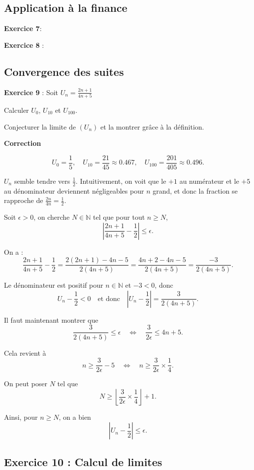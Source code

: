 \documentclass[a4paper, 12pt]{article}
\begin{document}
\subsection*{Application à la finance}
{\textbf{Exercice 7}: 
{\textbf{Exercice 8 }: 

\subsection*{ Convergence des suites}

{\textbf{Exercice 9 }: Soit \( U_n = \frac{2n+1}{4n+5} \)} 

Calculer \( U_0 \), \( U_{10} \) et \( U_{100} \).

Conjecturer la limite de \( (U_n) \) et la montrer grâce à la définition.

\textbf{Correction}

\[
U_0 = \frac{1}{5}, \quad U_{10} = \frac{21}{45} \approx 0.467, \quad U_{100} = \frac{201}{405} \approx 0.496.
\]

\( U_n \) semble tendre vers \( \frac{1}{2} \). Intuitivement, on voit que le \( +1 \) au numérateur et le \( +5 \) au dénominateur deviennent négligeables pour \( n \) grand, et donc la fraction se rapproche de \( \frac{2n}{4n} = \frac{1}{2} \).

Soit \( \epsilon > 0 \), on cherche \( N \in \mathbb{N} \) tel que pour tout \( n \geq N \),
\[
\left| \frac{2n+1}{4n+5} - \frac{1}{2} \right| \leq \epsilon.
\]

On a :
\[
\frac{2n+1}{4n+5} - \frac{1}{2} = \frac{2(2n+1) - 4n - 5}{2(4n+5)} = \frac{4n+2-4n-5}{2(4n+5)} = \frac{-3}{2(4n+5)}.
\]

Le dénominateur est positif pour \( n \in \mathbb{N} \) et \( -3 < 0 \), donc
\[
U_n - \frac{1}{2} < 0 \quad \text{et donc} \quad \left| U_n - \frac{1}{2} \right| = \frac{3}{2(4n+5)}.
\]

Il faut maintenant montrer que 
\[
\frac{3}{2(4n+5)} \leq \epsilon \quad \Longleftrightarrow \quad \frac{3}{2\epsilon} \leq 4n+5.
\]

Cela revient à 
\[
n \geq \frac{3}{2\epsilon} - 5 \quad \Longleftrightarrow \quad n \geq \frac{3}{2\epsilon} \times \frac{1}{4}.
\]

On peut poser \( N \) tel que
\[
N \geq \left\lfloor \frac{3}{2\epsilon} \times \frac{1}{4} \right\rfloor + 1.
\]

Ainsi, pour \( n \geq N \), on a bien
\[
\left| U_n - \frac{1}{2} \right| \leq \epsilon.
\]

\subsection*{Exercice 10 : Calcul de limites}

}}
\end{document}
